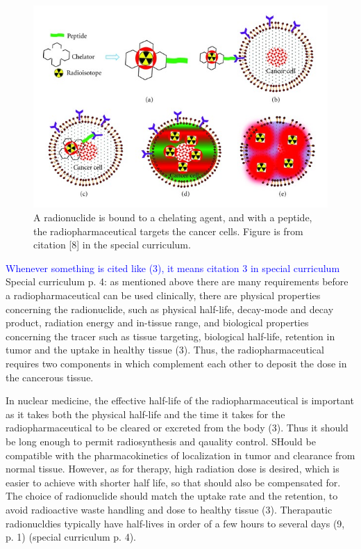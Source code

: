 \documentclass[a4paper,11pt,twoside]{book}
\begin{document}
\begin{figure}
    \centering
    \includegraphics[width=12cm\textwidth]{Theory/therapy-peptide.jpg}
    \caption{A radionuclide is bound to a chelating agent, and with a peptide, the radiopharmaceutical targets the cancer cells. Figure is from citation [8] in the special curriculum. }
    \label{fig:therapy_chelator_peptide}
\end{figure}

\noindent    \textcolor{blue}{Whenever something is cited like (3), it means citation 3 in special curriculum}
Special curriculum p. 4: as mentioned above there are many requirements before a radiopharmaceutical can be used clinically, there are physical properties concerning the radionuclide, such as physical half-life, decay-mode and decay product, radiation energy and in-tissue range, and biological properties concerning the tracer such as tissue targeting, biological half-life, retention in tumor and the uptake in healthy tissue (3).  Thus, the radiopharmaceutical requires two components in which complement each other to deposit the dose in the cancerous tissue. 

In nuclear medicine, the effective half-life of the radiopharmaceutical is important as it takes both the physical half-life and the time it takes for the radiopharmaceutical to be cleared or excreted from the body (3). Thus it should be long enough to permit radiosynthesis and qauality control. SHould be compatible with the pharmacokinetics of localization in tumor and clearance from normal tissue. However, as for therapy, high radiation dose is desired, which is easier to achieve with shorter half life, so that should also be compensated for. The choice of radionuclide should match the uptake rate and the retention, to avoid radioactive waste handling and dose to healthy tissue (3). Therapautic radionucldies typically have half-lives  in order of a few hours to several days (9, p. 1) (special curriculum p. 4).\\
\end{document}
